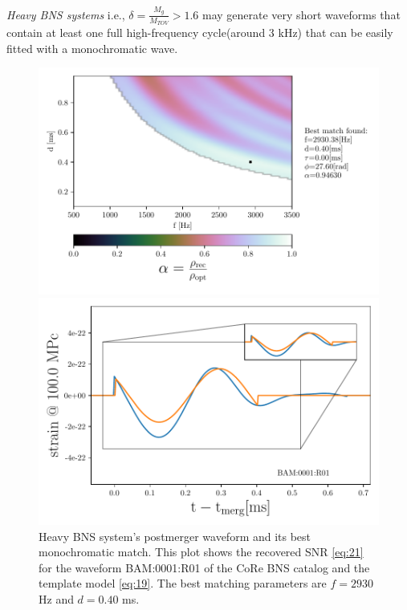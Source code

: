 \FloatBarrier



\textit{Heavy BNS systems} i.e., $\delta=\frac{M_g}{M_{TOV}}>1.6$ may generate very short waveforms that contain at least one full high-frequency cycle(around 3 kHz) that can be easily fitted with a monochromatic wave.

\begin{figure}[!htbp]
\begin{center}
\begin{minipage}[t]{0.5\linewidth}
\vspace{0pt}
\includegraphics[scale=0.6,trim={2mm 0 35mm 0},clip]{images/Data_analysis/results/2D_grid_7.pdf}
\end{minipage}%
\begin{minipage}[t]{0.5\linewidth}
\vspace{20pt}
\includegraphics[scale=0.45]{images/Data_analysis/results/2D_grid_8.pdf}
\end{minipage}
\captionsetup{width=0.8\textwidth}
\caption[Heavy BNS system's postmerger waveform and its best monochromatic match]{Heavy BNS system's postmerger waveform and its best monochromatic match. This plot shows the recovered SNR \ref{eq:21} for the waveform BAM:0001:R01 of the CoRe BNS catalog \cite{Dietrich:2018phi} and the template model \ref{eq:19}. The best matching parameters are $f=2930$ Hz and $d=0.40$ ms.}
\end{center}
\end{figure}

